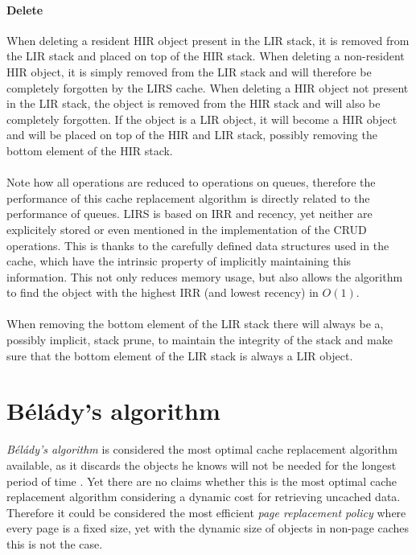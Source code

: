 \documentclass[pdftex,a4paper,12pt,twoside]{report}
\begin{document}
\paragraph{Delete} When deleting a resident HIR object present in the LIR stack, it is removed from the LIR stack and placed on top of the HIR stack. When deleting a non-resident HIR object, it is simply removed from the LIR stack and will therefore be completely forgotten by the LIRS cache. When deleting a HIR object not present in the LIR stack, the object is removed from the HIR stack and will also be completely forgotten. If the object is a LIR object, it will become a HIR object and will be placed on top of the HIR and LIR stack, possibly removing the bottom element of the HIR stack.
\\\\
Note how all operations are reduced to operations on queues, therefore the performance of this cache replacement algorithm is directly related to the performance of queues. LIRS is based on IRR and recency, yet neither are explicitely stored or even mentioned in the implementation of the CRUD operations. This is thanks to the carefully defined data structures used in the cache, which have the intrinsic property of implicitly maintaining this information. This not only reduces memory usage, but also allows the algorithm to find the object with the highest IRR (and lowest recency) in $O(1)$.
\\\\
When removing the bottom element of the LIR stack there will always be a, possibly implicit, stack prune, to maintain the integrity of the stack and make sure that the bottom element of the LIR stack is always a LIR object.
\section{Bélády's algorithm}
\emph{Bélády's algorithm} is considered the most optimal cache replacement algorithm available, as it discards the objects he knows will not be needed for the longest period of time \citep{cache-algorithm-lru-belady}. Yet there are no claims whether this is the most optimal cache replacement algorithm considering a dynamic cost for retrieving uncached data. Therefore it could be considered the most efficient \emph{page replacement policy} where every page is a fixed size, yet with the dynamic size of objects in non-page caches this is not the case.

\end{document}
